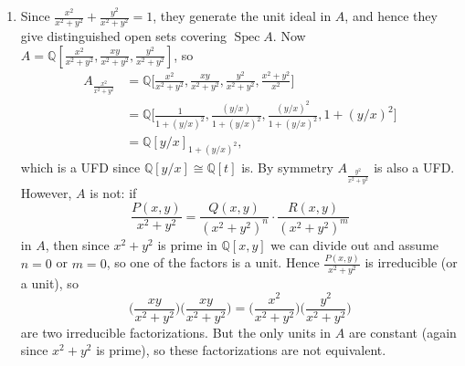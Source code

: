 \documentclass{report}
\newcommand{\Q}{\mathbb{Q}}
\DeclareMathOperator{\Spec}{Spec}
\begin{document}
\begin{enumerate}[label=\textbf{5.4.\Alph*.}]
	\item Since $\frac{x^2}{x^2+y^2}+\frac{y^2}{x^2+y^2}=1$, they generate the
	      unit ideal in $A$, and hence they give distinguished open sets covering
	      $\Spec A$. Now
	      $A=\Q[\frac{x^2}{x^2+y^2},\frac{xy}{x^2+y^2},\frac{y^2}{x^2+y^2}]$, so
	      \begin{align*}
		      A_{\frac{x^2}{x^2+y^2}}
		       & = \Q\biggl[\frac{x^2}{x^2+y^2},\frac{xy}{x^2+y^2},
		      \frac{y^2}{x^2+y^2},\frac{x^2+y^2}{x^2}\biggr]             \\
		       & = \Q\biggl[\frac{1}{1+(y/x)^2},\frac{(y/x)}{1+(y/x)^2},
		      \frac{(y/x)^2}{1+(y/x)^2},1+(y/x)^2\biggr]                 \\
		       & = \Q[y/x]_{1+(y/x)^2},
	      \end{align*}
	      which is a UFD since $\Q[y/x]\cong\Q[t]$ is. By symmetry
	      $A_{\frac{y^2}{x^2+y^2}}$ is also a UFD. However, $A$ is not: if
	      \begin{equation*}
		      \frac{P(x,y)}{x^2+y^2}
		      = \frac{Q(x,y)}{(x^2+y^2)^n}\cdot\frac{R(x,y)}{(x^2+y^2)^m}
	      \end{equation*}
	      in $A$, then since $x^2+y^2$ is prime in $\Q[x,y]$ we can divide out and assume
	      $n=0$ or $m=0$, so one of the factors is a unit. Hence
	      $\frac{P(x,y)}{x^2+y^2}$ is irreducible (or a unit), so
	      \begin{equation*}
		      \biggl(\frac{xy}{x^2+y^2}\biggr)\biggl(\frac{xy}{x^2+y^2}\biggr)
		      = \biggl(\frac{x^2}{x^2+y^2}\biggr)
		      \biggl(\frac{y^2}{x^2+y^2}\biggr)
	      \end{equation*}
	      are two irreducible factorizations. But the only units in $A$ are
	      constant (again since $x^2+y^2$ is prime), so these factorizations are
	      not equivalent.
\end{enumerate}
\end{document}
